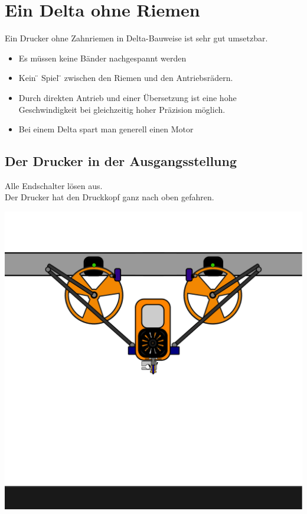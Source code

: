 \section{Ein Delta ohne Riemen}
\vspace{1cm}
\begin{center}
  Ein Drucker ohne Zahnriemen in Delta-Bauweise ist sehr gut umsetzbar.
\end{center}
\vspace{1cm}
\begin{itemize}
  \item Es müssen keine Bänder nachgespannt werden
  \item Kein \"{} Spiel \"{} zwischen den Riemen und den Antriebsrädern.
  \item Durch direkten Antrieb und einer Übersetzung ist eine hohe \\ Geschwindigkeit bei gleichzeitig hoher Präzision möglich.
  \item Bei einem Delta spart man generell einen Motor
\end{itemize}

\newpage %

\subsection{Der Drucker in der Ausgangsstellung}
\begin{center}
  Alle Endschalter lösen aus. \\Der Drucker hat den Druckkopf ganz nach oben gefahren.
\end{center}


\begin{center}
  \includegraphics[scale=0.5]{./bilder/mydelta.pdf}
\end{center}

